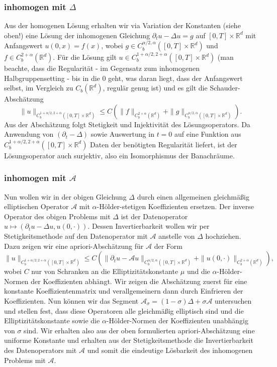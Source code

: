 \documentclass[11pt,a4paper]{scrartcl}
\newcommand{\R}{\mathbb{R}} %
\newcommand{\A}{\mathcal{A}}
\theoremstyle{plain}
\theoremstyle{definition}
\theoremstyle{remark}
\begin{document}
\subsubsection{inhomogen mit $\Delta$}

Aus der homogenen Lösung erhalten wir via Variation der Konstanten (siehe oben!) eine Lösung der inhomogenen Gleichung $\partial_t u - \Delta u = g$ auf $[0,T]\times \R^d$ mit Anfangswert $u(0,x)=f(x)$, wobei $g\in C_b^{\alpha/2,\alpha}([0,T]\times \R^d)$ und $f\in C_b^{2+\alpha}(\R^d)$. Für die Lösung gilt $u\in C_b^{1+\alpha/2, 2+\alpha}([0,T]\times \R^d)$ (man beachte, dass die Regularität - im Gegensatz zum inhomogenen Halbgruppensetting - bis in die $0$ geht, was daran liegt, dass der Anfangswert selbst, im Vergleich zu $C_b(\R^d)$, regulär genug ist) und es gilt die Schauder-Abschätzung $$\|u\|_{C_b^{1+\alpha/2, 2+\alpha}([0,T]\times \R^d)}\leq C \left( \|f\|_{C_b^{2+\alpha}(\R^d)} + \|g\|_{C_b^{\alpha/2,\alpha}([0,T]\times \R^d)} \right).$$ Aus der Abschätzung folgt Stetigkeit und Injektivität des Lösungsoperators. Da Anwendung von $(\partial_t - \Delta)$ sowie Auswertung in $t=0$ auf eine Funktion aus $C_b^{1+\alpha/2, 2+\alpha}([0,T]\times \R^d)$ Daten der benötigten Regularität liefert, ist der Lösungsoperator auch surjektiv, also ein Isomorphismus der Banachräume.

\subsubsection{inhomogen mit $\A$}

Nun wollen wir in der obigen Gleichung $\Delta$ durch einen allgemeinen gleichmäßig elliptischen Operator $\A$ mit $\alpha$-Hölder-stetigen Koeffizienten ersetzen. Der inverse Operator des obigen Problems mit $\Delta$ ist der Datenoperator $u\mapsto (\partial_t u - \Delta u, u(0,\cdot))$. Dessen Invertierbarkeit wollen wir per Stetigkeitsmethode auf den Datenoperator mit $\A$ anstelle von $\Delta$ hochziehen. Dazu zeigen wir eine apriori-Abschätzung für $\A$ der Form $$\|u\|_{C_b^{1+\alpha/2,2+\alpha}([0,T]\times \R^d)} \leq C \left( \|\partial_t u - \A u\|_{C_b^{\alpha/2,\alpha}([0,T]\times \R^d)} + \|u(0,\cdot)\|_{C_b^{2+\alpha}(\R^d)} \right),$$ wobei $C$ nur von Schranken an die Elliptizitätskonstante $\mu$ und die $\alpha$-Hölder-Normen der Koeffizienten abhängt. Wir zeigen die Abschätzung zuerst für eine konstante Koeffizientenmatrix und verallgemeinern dann durch Einfrieren der Koeffizienten. Nun können wir das Segment $\A_\sigma = (1-\sigma)\Delta + \sigma \A$ untersuchen und stellen fest, dass diese Operatoren alle gleichmäßig elliptisch sind und die Elliptizitätskonstante sowie die $\alpha$-Hölder-Normen der Koeffizienten unabhängig von $\sigma$ sind. Wir erhalten also aus der oben formulierten apriori-Abschätzung eine uniforme Konstante und erhalten aus der Stetigkeitsmethode die Invertierbarkeit des Datenoperators mit $\A$ und somit die eindeutige Lösbarkeit des inhomogenen Problems mit $\A$.
\end{document}
